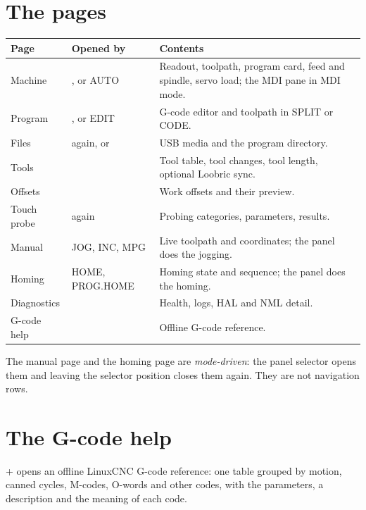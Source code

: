 \section{The pages}

\begin{longtable}{L{3.0cm}L{4.6cm}L{5.2cm}}
  \toprule
  \textbf{Page} & \textbf{Opened by} & \textbf{Contents} \\
  \midrule
  \endhead
  Machine & , or AUTO & Readout, toolpath, program card, feed and spindle, servo
        load; the MDI pane in MDI mode. \\
  Program & , or EDIT & G-code editor and toolpath in SPLIT or CODE. \\
  Files &  again, or  & USB media and the program
        directory. \\
  Tools &  & Tool table, tool changes, tool length, optional Loobric sync. \\
  Offsets &  & Work offsets and their preview. \\
  Touch probe &  again & Probing categories, parameters, results. \\
  Manual & JOG, INC, MPG & Live toolpath and coordinates; the panel does the jogging. \\
  Homing & HOME, PROG.HOME & Homing state and sequence; the panel does the homing. \\
  Diagnostics &  & Health, logs, HAL and NML detail. \\
  G-code help &  & Offline G-code reference. \\
  \bottomrule
\end{longtable}

The manual page and the homing page are \emph{mode-driven}: the panel selector opens them
and leaving the selector position closes them again. They are not navigation rows.

\section{The G-code help}


+ opens an offline LinuxCNC G-code reference: one table grouped by
motion, canned cycles, M-codes, O-words and other codes, with the parameters, a description
and the meaning of each code.

